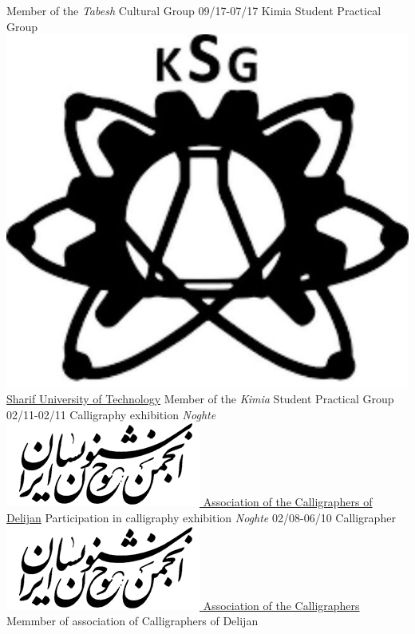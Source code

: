\documentclass[a4paper]{friggeri-cv}
\begin{document}
\begin{entrylist}
     {Member of the \emph{Tabesh} Cultural Group}
    \entry
    {09/17-07/17}
    {   Kimia Student Practical Group}
    {\href{http://www.sharif.ir}{\includegraphics[scale=0.03]{img/Kimia_logo.jpg} Sharif University of Technology}}
    {Member of the \emph{Kimia} Student Practical Group}
    \entry
    {02/11-02/11}
    {    Calligraphy exhibition \emph{Noghte}}
    {\href{http://calligraphers.ir/}{\includegraphics[scale=0.15]{img/Khoshnevisan_logo.png} Association of the Calligraphers of Delijan}}
    {Participation in calligraphy exhibition \emph{Noghte}}
    \entry
    {02/08-06/10}
    {   Calligrapher}
    {\href{http://calligraphers.ir/}{\includegraphics[scale=0.15]{img/Khoshnevisan_logo.png} Association of the Calligraphers}}
    {Memmber of association of Calligraphers of Delijan}
\end{entrylist}
\\
\end{document}
